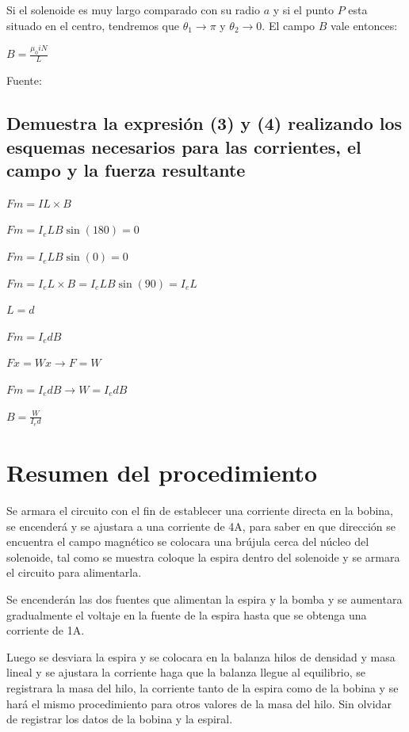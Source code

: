 \documentclass[letterpaper, 12pt]{article}
\begin{document}
\begin{multicols}{2}
	Si el solenoide es muy largo comparado con su radio $a$ y si el punto $P$ esta
	situado en el centro, tendremos que $\theta_1 \rightarrow \pi$ y
	$\theta_2 \rightarrow 0$. El campo $B$ vale entonces:

	{\large $B = \frac{\mu_0 i N}{L}$}

	Fuente:~\cite{CampoElectricoSolenoide}

	\subsection*{Demuestra la expresión (3) y (4) realizando los esquemas necesarios para las corrientes, el
		campo y la fuerza resultante}

	{\large $Fm = IL \times B$}

	$Fm = I_e L B \sin(180) = 0$

	$Fm = I_e L B \sin(0) = 0$

	$Fm = I_e L \times B = I_e L B \sin(90) = I_e L $

	$L = d$

	$Fm = I_e d B$

	$Fx = Wx \rightarrow F = W$

	$Fm = I_e d B \rightarrow W = I_e d B$

	$B = \frac{W}{I_e d}$

	\section{Resumen del procedimiento}

	Se armara el circuito con el fin de establecer una corriente directa en
	la bobina, se encenderá y se ajustara a una corriente de 4A, para saber
	en que dirección se encuentra el campo magnético se colocara una brújula
	cerca del núcleo del solenoide, tal como se muestra coloque la espira
	dentro del solenoide  y se armara el circuito para alimentarla.

	Se encenderán las dos fuentes que alimentan la espira y la bomba y se
	aumentara gradualmente el voltaje en la fuente de la espira hasta que se
	obtenga una corriente de 1A.

	Luego se desviara la espira y se colocara en la balanza hilos de densidad
	y masa lineal y se ajustara la corriente haga que la balanza llegue al
	equilibrio, se registrara la masa del hilo, la corriente tanto de la
	espira como de la bobina y se hará el mismo procedimiento para otros
	valores de la masa del hilo. Sin olvidar de registrar los datos de la
	bobina y la espiral.

\end{multicols}

\newpage


\end{document}
